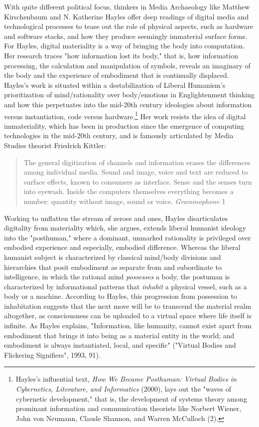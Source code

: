 \documentclass[11pt]{article}
\begin{document}
With quite different political focus, thinkers in Media Archaeology
like Matthew Kirschenbaum and N. Katherine Hayles offer deep readings
of digital media and technological processes to tease out the role of
physical aspects, such as hardware and software stacks, and how they
produce seemingly immaterial surface forms. For Hayles, digital
materiality is a way of bringing the body into computation. Her
research traces "how information lost its body," that is, how
information processing, the calculation and manipulation of symbols,
reveals an imaginary of the body and the experience of embodiment that
is continually displaced. Hayles's work is situated within a
destabilization of Liberal Humanism's prioritization of
mind/rationality over body/emotions in Englightenment thinking and how
this perpetuates into the mid-20th century ideologies about
information versus instantiation, code versus hardware.\footnote{Hayles's influential text, \emph{How We Became Posthuman: Virtual
Bodies in Cybernetics, Literature, and Informatics} (2000), lays out
the "waves of cybernetic development," that is, the development of
systems theory among prominant information and communication theorists
like Norbert Wiener, John von Neumann, Claude Shannon, and Warren
McCulloch (2).} Her work
resists the idea of digital immateriality, which has been in
production since the emergence of computing technologies in the
mid-20th century, and is famously articulated by Media Studies
theorist Friedrich Kittler:
\begin{quote}
The general digitization of channels and information erases the
differences among individual media. Sound and image, voice and text
are reduced to surface effects, known to consumers as interface. Sense
and the senses turn into eyewash. Inside the computers themselves
everything becomes a number: quantity without image, sound or
voice. \emph{Grammophone} 1
\end{quote}
Working to unflatten the stream of zeroes and ones, Hayles
disarticulates digitality from materiality which, she argues, extends
liberal humanist ideology into the "posthuman," where a dominant,
unmarked rationality is privileged over embodied experience and
especially, embodied difference. Whereas the liberal humanist subject
is characterized by classical mind/body divisions and hierarchies that
posit embodiment as separate from and subordinate to intelligence, in
which the rational mind \emph{possesses} a body, the postuman is
characterized by informational patterns that \emph{inhabit} a physical
vessel, such as a body or a machine. According to Hayles, this
progression from possession to inhabitation suggests that the next
move will be to transcend the material realm altogether, as
consciousness can be uploaded to a virtual space where life itself is
infinite. As Hayles explains, "Information, like humanity, cannot
exist apart from embodiment that brings it into being as a material
entity in the world; and embodiment is always instantiated, local, and
specific" ("Virtual Bodies and Flickering Signifiers", 1993, 91).
\end{document}
